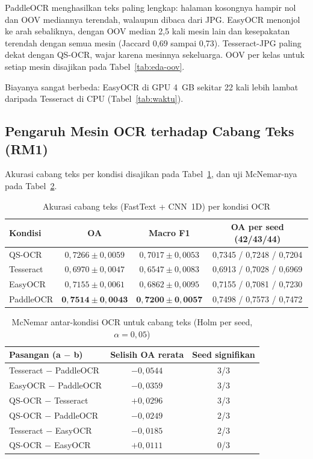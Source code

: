 PaddleOCR menghasilkan teks paling lengkap: halaman kosongnya hampir nol dan OOV
mediannya terendah, walaupun dibaca dari JPG. EasyOCR menonjol ke arah sebaliknya, dengan
OOV median 2,5 kali mesin lain dan kesepakatan terendah dengan semua mesin (Jaccard 0,69
sampai 0,73). Tesseract-JPG paling dekat dengan QS-OCR, wajar karena mesinnya sekeluarga.
OOV per kelas untuk setiap mesin disajikan pada Tabel~\ref{tab:eda-oov}.

Biayanya sangat berbeda: EasyOCR di GPU 4~GB sekitar 22 kali lebih lambat daripada
Tesseract di CPU (Tabel~\ref{tab:waktu}).

\subsection{Pengaruh Mesin OCR terhadap Cabang Teks (RM1)}\label{sec:hasil-teks}

Akurasi cabang teks per kondisi disajikan pada Tabel~\ref{tab:teks}, dan uji
McNemar-nya pada Tabel~\ref{tab:mcnemar-ocr}.

\begin{table}[H]
  \centering
  \caption{Akurasi cabang teks (FastText + CNN~1D) per kondisi OCR}
  \label{tab:teks}
  \fontsize{10}{12}\selectfont
  \begin{tabular}{|l|c|c|c|}
    \hline
    \textbf{Kondisi} & \textbf{OA} & \textbf{Macro F1} & \textbf{OA per seed (42/43/44)} \\ \hline
    QS-OCR & $0{,}7266 \pm 0{,}0059$ & $0{,}7017 \pm 0{,}0053$ & 0,7345 / 0,7248 / 0,7204 \\ \hline
    Tesseract & $0{,}6970 \pm 0{,}0047$ & $0{,}6547 \pm 0{,}0083$ & 0,6913 / 0,7028 / 0,6969 \\ \hline
    EasyOCR & $0{,}7155 \pm 0{,}0061$ & $0{,}6862 \pm 0{,}0095$ & 0,7155 / 0,7081 / 0,7230 \\ \hline
    PaddleOCR & $\mathbf{0{,}7514 \pm 0{,}0043}$ & $\mathbf{0{,}7200 \pm 0{,}0057}$ &
    0,7498 / 0,7573 / 0,7472 \\ \hline
  \end{tabular}
\end{table}

\begin{table}[H]
  \centering
  \caption{McNemar antar-kondisi OCR untuk cabang teks (Holm per seed, $\alpha = 0{,}05$)}
  \label{tab:mcnemar-ocr}
  \fontsize{10}{12}\selectfont
  \begin{tabular}{|l|c|c|}
    \hline
    \textbf{Pasangan (a $-$ b)} & \textbf{Selisih OA rerata} & \textbf{Seed signifikan} \\ \hline
    Tesseract $-$ PaddleOCR & $-0{,}0544$ & 3/3 \\ \hline
    EasyOCR $-$ PaddleOCR & $-0{,}0359$ & 3/3 \\ \hline
    QS-OCR $-$ Tesseract & $+0{,}0296$ & 3/3 \\ \hline
    QS-OCR $-$ PaddleOCR & $-0{,}0249$ & 2/3 \\ \hline
    Tesseract $-$ EasyOCR & $-0{,}0185$ & 2/3 \\ \hline
    QS-OCR $-$ EasyOCR & $+0{,}0111$ & 0/3 \\ \hline
  \end{tabular}
\end{table}

